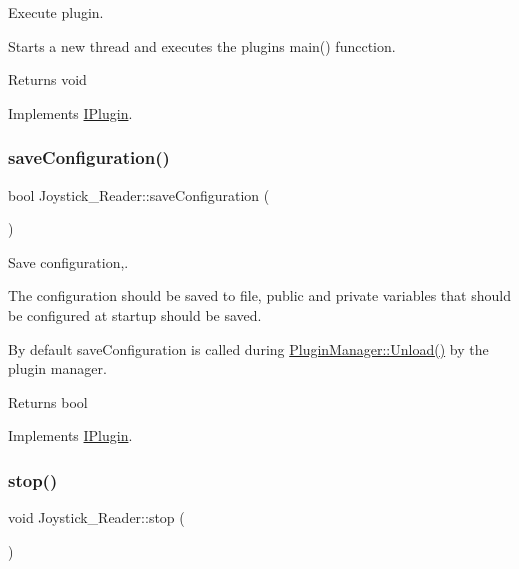 Execute plugin. 

Starts a new thread and executes the plugins main() funcction. \begin{DoxyReturn}{Returns}
void 
\end{DoxyReturn}


Implements \hyperlink{class_i_plugin_a46b4ace767e77f9db9c9585e99c09039}{I\+Plugin}.

\mbox{\label{class_joystick___reader_a037ce3a1ee3aef5b722a768a4c1e1181}} 
\subsubsection{\texorpdfstring{save\+Configuration()}{saveConfiguration()}}
{\footnotesize\ttfamily bool Joystick\+\_\+\+Reader\+::save\+Configuration (\begin{DoxyParamCaption}{ }\end{DoxyParamCaption})\hspace{0.3cm}{\ttfamily [virtual]}}



Save configuration,. 

The configuration should be saved to file, public and private variables that should be configured at startup should be saved.

By default save\+Configuration is called during \hyperlink{class_plugin_manager_ab651a05d6fcb92562807e9f5ecc30855}{Plugin\+Manager\+::\+Unload()} by the plugin manager.

\begin{DoxyReturn}{Returns}
bool 
\end{DoxyReturn}


Implements \hyperlink{class_i_plugin_a79b5c42b1c7b08257a6110b2091039bc}{I\+Plugin}.

\mbox{\label{class_joystick___reader_a44c818d23aa269ed72701291ff65b4b3}} 
\subsubsection{\texorpdfstring{stop()}{stop()}}
{\footnotesize\ttfamily void Joystick\+\_\+\+Reader\+::stop (\begin{DoxyParamCaption}{ }\end{DoxyParamCaption})\hspace{0.3cm}{\ttfamily [virtual]}}



